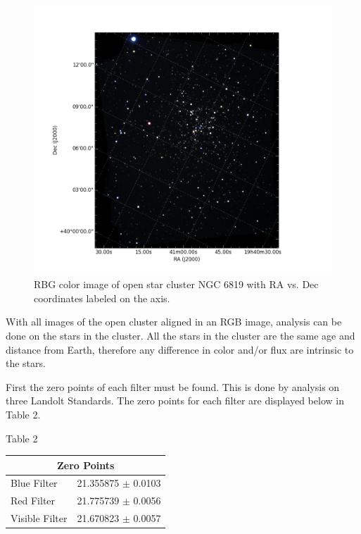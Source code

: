 \documentclass[11pt,twocolumn]{article}
\begin{document}
\begin{center}
\begin{figure}
\includegraphics[scale=0.35]{figure_1}
\caption{\small{RBG color image of open star cluster NGC 6819 with RA vs. Dec coordinates labeled on the axis.}}
\end{figure}
\end{center}

With all images of the open cluster aligned in an RGB image, analysis can be done on the stars in the cluster. 
All the stars in the cluster are the same age and distance from Earth, therefore any difference in color and/or flux are intrinsic to the stars.

First the zero points of each filter must be found. This is done by analysis on three Landolt Standards. The zero points for each filter are displayed below in Table 2.

\begin{center}
Table 2
\end{center}
\begin{center} 
\begin{tabular}{|l|l|}
\hline
\multicolumn{2}{|c|}{Zero Points} \\
\hline
Blue Filter & 21.355875 $\pm$ 0.0103 \\
Red Filter & 21.775739 $\pm$ 0.0056 \\
Visible Filter & 21.670823 $\pm$ 0.0057 \\
\hline
\end{tabular}
\end{center}
\end{document}
